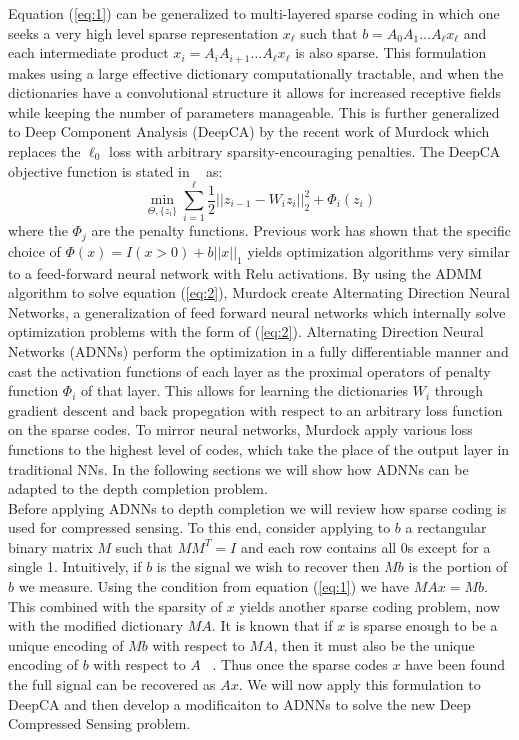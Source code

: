 Equation (\ref{eq:1}) can be generalized to multi-layered sparse coding in which one seeks a very high level sparse representation $x_{\ell}$ such that $b = A_0A_1\ldots A_{\ell}x_{\ell}$ and each intermediate product $x_i = A_iA_{i+1}\ldots A_{\ell}x_{\ell}$ is also sparse. This formulation makes using a large effective dictionary computationally tractable, and when the dictionaries have a convolutional structure it allows for increased receptive fields while keeping the number of parameters manageable. This is further generalized to Deep Component Analysis (DeepCA) by the recent work of Murdock \etal which replaces the $\ell_0$ loss with arbitrary sparsity-encouraging penalties. The DeepCA objective function is stated in ~\cite{} as:
\begin{equation}
  \label{eq:2}
  \min_{\Theta, \{z_i\}} \sum_{i=1}^{\ell} \frac{1}{2} \left|| z_{i-1} - W_iz_i\right||_2^2 + \Phi_i(z_i)
\end{equation}
where the $\Phi_j$ are the penalty functions. Previous work has shown that the specific choice of $\Phi(x) = I(x > 0) + b\left||x\right||_1$ yields optimization algorithms very similar to a feed-forward neural network with Relu activations. By using the ADMM algorithm to solve equation (\ref{eq:2}), Murdock \etal create Alternating Direction Neural Networks, a generalization of feed forward neural networks which internally solve optimization problems with the form of (\ref{eq:2}). Alternating Direction Neural Networks (ADNNs) perform the optimization in a fully differentiable manner and cast the activation functions of each layer as the proximal operators of penalty function $\Phi_i$ of that layer. This allows for learning the dictionaries $W_i$ through gradient descent and back propegation with respect to an arbitrary loss function on the sparse codes. To mirror neural networks, Murdock \etal apply various loss functions to the highest level of codes, which take the place of the output layer in traditional NNs. In the following sections we will show how ADNNs can be adapted to the depth completion problem.\\

Before applying ADNNs to depth completion we will review how sparse coding is used for compressed sensing. To this end, consider applying to $b$ a rectangular binary matrix $M$ such that $MM^T = I$ and each row contains all 0s except for a single 1. Intuitively, if $b$ is the signal we wish to recover then $Mb$ is the portion of $b$ we measure. Using the condition from equation (\ref{eq:1}) we have $MAx = Mb$. This combined with the sparsity of $x$ yields another sparse coding problem, now with the modified dictionary $MA$. It is known that if $x$ is sparse enough to be a unique encoding of $Mb$ with respect to $MA$, then it must also be the unique encoding of $b$ with respect to $A$ ~\cite{}. Thus once the sparse codes $x$ have been found the full signal can be recovered as $Ax$. We will now apply this formulation to DeepCA and then develop a modificaiton to ADNNs to solve the new Deep Compressed Sensing problem.

